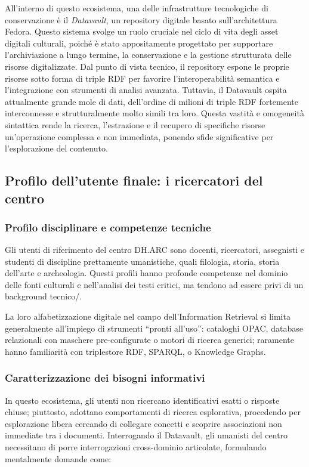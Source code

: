 \documentclass[12pt,a4paper,oneside]{book}
\begin{document}
        All'interno di questo ecosistema, una delle infrastrutture tecnologiche di conservazione è il \textit{Datavault}, un repository digitale basato sull'architettura Fedora.
        Questo sistema svolge un ruolo cruciale nel ciclo di vita degli asset digitali culturali, poiché è stato appositamente progettato per supportare l'archiviazione a lungo termine, la conservazione e la gestione strutturata delle risorse digitalizzate. 
        Dal punto di vista tecnico, il repository espone le proprie risorse sotto forma di triple RDF per favorire l'interoperabilità semantica e l'integrazione con strumenti di analisi avanzata.\cite{Far25}
        Tuttavia, il Datavault ospita attualmente grande mole di dati, dell'ordine di milioni di triple RDF fortemente interconnesse e strutturalmente molto simili tra loro.
        Questa vastità e omogeneità sintattica rende la ricerca, l'estrazione e il recupero di specifiche risorse un'operazione complessa e non immediata, ponendo sfide significative per l'esplorazione del contenuto.

    \subsection{Profilo dell'utente finale: i ricercatori del centro}\label{subsec:utenti}

        \subsubsection{Profilo disciplinare e competenze tecniche}
            Gli utenti di riferimento del centro DH.ARC sono docenti, ricercatori, assegnisti e studenti di discipline prettamente umanistiche, quali filologia, storia, storia dell'arte e archeologia.\cite{Per22}
            Questi profili hanno profonde competenze nel dominio delle fonti culturali e nell'analisi dei testi critici, ma tendono ad essere privi di un background tecnico\slash\@informatico. 

            La loro alfabetizzazione digitale nel campo dell'Information Retrieval si limita generalmente all'impiego di strumenti ``pronti all'uso'': cataloghi OPAC, database relazionali con maschere pre-configurate o motori di ricerca generici; raramente hanno familiarità con triplestore RDF, SPARQL, o Knowledge Graphs.

        \subsubsection{Caratterizzazione dei bisogni informativi}
            In questo ecosistema, gli utenti non ricercano identificativi esatti o risposte chiuse; piuttosto, adottano comportamenti di ricerca esplorativa, procedendo per esplorazione libera cercando di collegare concetti e scoprire associazioni non immediate tra i documenti.
            Interrogando il Datavault, gli umanisti del centro necessitano di porre interrogazioni cross-dominio articolate, formulando mentalmente domande come: 
\end{document}
